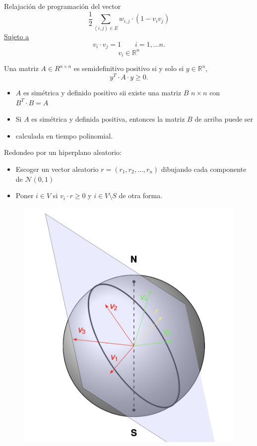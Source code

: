 \documentclass[letterpaper]{article}
\newcommand{\R}{\mathbb{R}}
\begin{document}
Relajación de programación del vector
\[   \frac{1}{2}\sum_{(i,j)\in E} w_{i,j}\cdot(1-v_iv_j)   \]
\underline{Sujeto a }
\[   v_i \cdot v_j = 1 \qquad i=1,\ldots n.   \]
\[   v_i \in \R^n     \]

\begin{definition}
    Una matriz $A \in R^{n\times n}$ es semidefinitivo positivo si y solo si $y \in \R^n$,
    \[   y^T \cdot A \cdot y \geq 0.   \]
\end{definition}

\begin{itemize}
    \item $A$ es simétrica y definido positivo sii existe una matriz $B$ $n \times n$ con
    $B^T \cdot B = A$
    \item Si $A$ es simétrica y definida positiva, entonces la matriz $B$ de arriba puede ser
    \item calculada en tiempo polinomial.
\end{itemize}

Redondeo por un hiperplano aleatorio:
\begin{itemize}
    \item Escoger un vector aleatorio $r = (r_1,r_2, \ldots, r_n)$ dibujando cada componente de
    $\mathcal{N}(0,1)$
    \item Poner $i \in V$ si $v_i \cdot r \geq 0$ y $i \in V \setminus S$ de otra forma.
\end{itemize}

\begin{figure}[H]
	\centering
		\includegraphics[scale=0.4]{5.png}
\end{figure}
\end{document}
